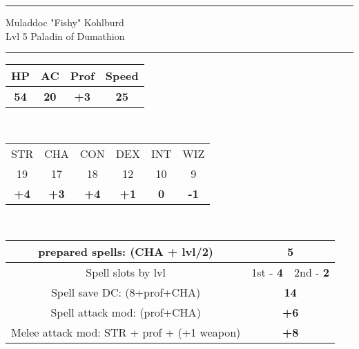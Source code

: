 \documentclass[12pt, xcolor={dvipsnames}]{beamer}
\newcommand{\str}{{\color{red}STR}}
\newcommand{\con}{{\color{red}CON}}
\newcommand{\wiz}{{\color{red}WIZ}}
\newcommand{\dex}{{\color{red}DEX}}
\newcommand{\inte}{{\color{red}INT}}
\newcommand{\cha}{{\color{red}CHA}}
\begin{document}
\begin{frame}
  \large
  \centering

  \vspace{.5em}
  \hrule
  \vspace{.5em}
  {\color{blue}Muladdoc "Fishy" Kohlburd}\\
  \normalsize{{\color{Cerulean} Lvl 5} \color{OliveGreen}Paladin of Dumathion}\\
  \vspace{.5em}
  \hrule
  \vspace{.5em}
  \small

  \begin{tabular}{|c|c|c|c|}
    \textbf{\color{Mahogany}HP} & \textbf{\color{Mahogany}AC} & Prof & Speed\\ \hline
    \textbf{54} & \textbf{20} & \textbf{+3} & \textbf{25}\\
  \end{tabular}\\
  \vspace{1em}

  \begin{tabular}{|c|c|c|c|c|c|}
    {\str} & {\cha} & {\con} & {\dex} & {\inte} & {\wiz}\\
    19 & 17 & 18 & 12 & 10 & 9\\\hline
    \textbf{+4} & \textbf{+3} & \textbf{+4} & \textbf{+1} & \textbf{0} & \textbf{-1}\\
  \end{tabular}\\
  \vspace{1em}

  \begin{tabular}{|c|c|c|}
    prepared spells: ({\cha} + lvl/2) & \multicolumn{2}{|c|}{\textbf{\color{OliveGreen}5}}\\ \hline

    Spell slots by lvl & 1st - \textbf{\color{OliveGreen}4} & 2nd - \textbf{\color{OliveGreen}2}\\ \hline

    Spell save DC: (8+prof+{\cha}) & \multicolumn{2}{|c|}{\textbf{\color{OliveGreen}14}}\\ \hline

    Spell attack mod: (prof+{\cha}) & \multicolumn{2}{|c|}{\textbf{\color{OliveGreen}+6}}\\ \hline

    Melee attack mod: {\str} + prof + (+1 weapon) & \multicolumn{2}{|c|}{\textbf{\color{OliveGreen} +8}}\\
  \end{tabular}
\end{frame}
\end{document}
